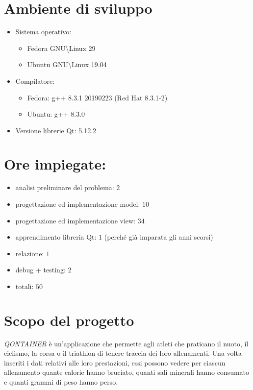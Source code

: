\documentclass[10pt, a4paper]{article}
\begin{document}
\section{Ambiente di sviluppo}
\begin{itemize}
	\item{Sistema operativo: 
	    \begin{itemize}
	        \item Fedora GNU\textbackslash{Linux} 29
	        \item Ubuntu GNU\textbackslash{Linux} 19.04
	    \end{itemize}
	}
	\item {Compilatore:
	    \begin{itemize}
	        \item Fedora: g++ 8.3.1 20190223 (Red Hat 8.3.1-2)
	        \item Ubuntu: g++ 8.3.0
	    \end{itemize}
	}
	\item{Versione librerie Qt: 5.12.2}
\end{itemize}
\section{Ore impiegate:}
\begin{itemize}
	\item{analisi preliminare del problema: $2$}
	\item{progettazione ed implementazione model: $10$}
	\item{progettazione ed implementazione view: $34$}
	\item{apprendimento libreria Qt: $1$ (perché già imparata gli anni scorsi)}
	\item{relazione: $1$}
	\item{debug + testing: $2$}
	\item{totali: $50$}
\end{itemize}

\section{Scopo del progetto}
\emph{QONTAINER} è un'applicazione che permette agli atleti che praticano il nuoto, il ciclismo, la corsa
o il triathlon di tenere traccia dei loro allenamenti. Una volta inseriti i dati relativi alle loro prestazioni, 
essi possono vedere per ciascun allenamento quante calorie hanno bruciato, quanti sali minerali hanno consumato
e quanti grammi di peso hanno perso.
\end{document}
